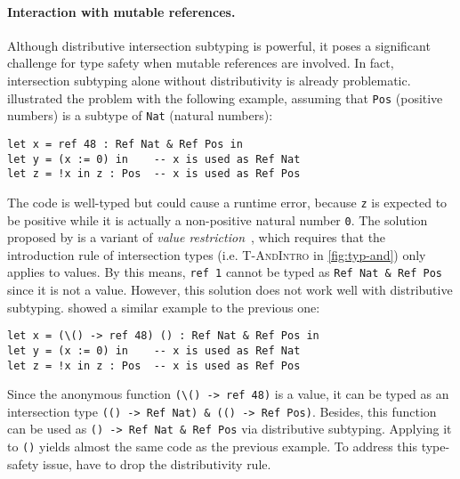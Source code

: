 \paragraph{Interaction with mutable references.}
Although distributive intersection subtyping is powerful, it poses a significant
challenge for type safety when mutable references are involved. In fact,
intersection subtyping alone without distributivity is already problematic.
\citet{davies2000intersection} illustrated the problem with the following
example, assuming that \lstinline[morekeywords=Pos]{Pos} (positive numbers) is a
subtype of \lstinline[morekeywords=Nat]{Nat} (natural numbers):
\begin{lstlisting}[morekeywords={Nat,Pos}]
let x = ref 48 : Ref Nat & Ref Pos in
let y = (x := 0) in    -- x is used as Ref Nat
let z = !x in z : Pos  -- x is used as Ref Pos
\end{lstlisting}
The code is well-typed but could cause a runtime error, because \lstinline{z} is
expected to be positive while it is actually a non-positive natural number
\lstinline{0}. The solution proposed by \citeauthor{davies2000intersection} is a
variant of \emph{value restriction}~\citep{wright1995simple}, which requires
that the introduction rule of intersection types (i.e. \textsc{T-AndIntro} in
\autoref{fig:typ-and}) only applies to values. By this means, \lstinline{ref 1}
cannot be typed as \lstinline[morekeywords={Nat,Pos}]{Ref Nat & Ref Pos} since
it is not a value. However, this solution does not work well with distributive
subtyping. \citeauthor{davies2000intersection} showed a similar example to the
previous one:
\begin{lstlisting}[morekeywords={Nat,Pos}]
let x = (\() -> ref 48) () : Ref Nat & Ref Pos in
let y = (x := 0) in    -- x is used as Ref Nat
let z = !x in z : Pos  -- x is used as Ref Pos
\end{lstlisting}
Since the anonymous function \lstinline{(\() -> ref 48)} is a value,
it can be typed as an intersection type
\lstinline[morekeywords={Nat,Pos}]{(() -> Ref Nat) & (() -> Ref Pos)}.
Besides, this function can be used as
\lstinline[morekeywords={Nat,Pos}]{() -> Ref Nat & Ref Pos}
via distributive subtyping. Applying it to \lstinline{()} yields almost the same
code as the previous example. To address this type-safety issue,
\citeauthor{davies2000intersection} have to drop the distributivity rule.

